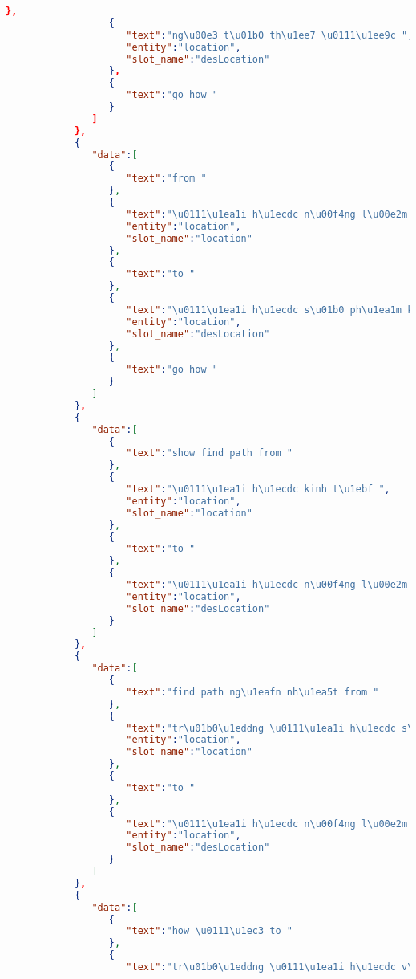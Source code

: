 \begin{lstlisting}[language=json,firstnumber=1]
                  },
                  {
                     "text":"ng\u00e3 t\u01b0 th\u1ee7 \u0111\u1ee9c ",
                     "entity":"location",
                     "slot_name":"desLocation"
                  },
                  {
                     "text":"go how "
                  }
               ]
            },
            {
               "data":[
                  {
                     "text":"from "
                  },
                  {
                     "text":"\u0111\u1ea1i h\u1ecdc n\u00f4ng l\u00e2m ",
                     "entity":"location",
                     "slot_name":"location"
                  },
                  {
                     "text":"to "
                  },
                  {
                     "text":"\u0111\u1ea1i h\u1ecdc s\u01b0 ph\u1ea1m k\u1ef9 thu\u1eadt ",
                     "entity":"location",
                     "slot_name":"desLocation"
                  },
                  {
                     "text":"go how "
                  }
               ]
            },
            {
               "data":[
                  {
                     "text":"show find path from "
                  },
                  {
                     "text":"\u0111\u1ea1i h\u1ecdc kinh t\u1ebf ",
                     "entity":"location",
                     "slot_name":"location"
                  },
                  {
                     "text":"to "
                  },
                  {
                     "text":"\u0111\u1ea1i h\u1ecdc n\u00f4ng l\u00e2m ",
                     "entity":"location",
                     "slot_name":"desLocation"
                  }
               ]
            },
            {
               "data":[
                  {
                     "text":"find path ng\u1eafn nh\u1ea5t from "
                  },
                  {
                     "text":"tr\u01b0\u1eddng \u0111\u1ea1i h\u1ecdc s\u01b0 ph\u1ea1m k\u0129 thu\u1eadt ",
                     "entity":"location",
                     "slot_name":"location"
                  },
                  {
                     "text":"to "
                  },
                  {
                     "text":"\u0111\u1ea1i h\u1ecdc n\u00f4ng l\u00e2m ",
                     "entity":"location",
                     "slot_name":"desLocation"
                  }
               ]
            },
            {
               "data":[
                  {
                     "text":"how \u0111\u1ec3 to "
                  },
                  {
                     "text":"tr\u01b0\u1eddng \u0111\u1ea1i h\u1ecdc v\u0103n lang ",

\end{lstlisting}
